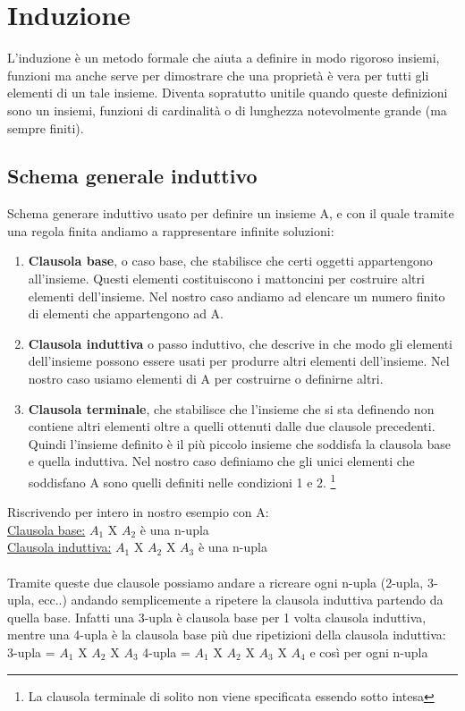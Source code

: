 \newpage
\section{Induzione}
L'induzione è un metodo formale che aiuta a definire in modo rigoroso insiemi, funzioni ma anche serve per dimostrare che una proprietà è vera per tutti gli elementi di un tale insieme. Diventa sopratutto unitile quando queste definizioni sono un insiemi, funzioni di cardinalità o di lunghezza notevolmente grande (ma sempre finiti).
\subsection{Schema generale induttivo}
Schema generare induttivo usato per definire un insieme A, e con il quale tramite una regola finita andiamo a rappresentare infinite soluzioni:
\begin{enumerate}
    \item \textbf{Clausola base}, o caso base, che stabilisce che certi oggetti appartengono all'insieme. Questi elementi costituiscono i mattoncini per costruire altri elementi dell’insieme. Nel nostro caso andiamo ad elencare un numero finito di elementi che appartengono ad A.
    \item \textbf{Clausola induttiva} o passo induttivo, che descrive in che modo gli elementi dell'insieme possono essere usati per produrre altri elementi dell'insieme. Nel nostro caso usiamo elementi di A per costruirne o definirne altri.
    \item \textbf{Clausola terminale}, che stabilisce che l'insieme che si sta definendo non contiene altri elementi oltre a quelli ottenuti dalle due clausole precedenti. Quindi l'insieme definito è il più piccolo insieme che soddisfa la clausola base e quella induttiva. Nel nostro caso definiamo che gli unici elementi che soddisfano A sono quelli definiti nelle condizioni 1 e 2. \footnote{La clausola terminale di solito non viene specificata essendo sotto intesa}
\end{enumerate}
\begin{example}
    Riscrivendo per intero in nostro esempio con A:\\
    \underline{Clausola base:} $A_1$ X $A_2$ è una n-upla\\
    \underline{Clausola induttiva:} $A_1$ X $A_2$ X $A_3$ è una n-upla\\ \\
    Tramite queste due clausole possiamo andare a ricreare ogni n-upla (2-upla, 3-upla, ecc..) andando semplicemente a ripetere la clausola induttiva partendo da quella base. Infatti una 3-upla è clausola base per 1 volta clausola induttiva, mentre una 4-upla è la clausola base più due ripetizioni della clausola induttiva: \\
    3-upla = $A_1$ X $A_2$ X $A_3$ \hspace{.5cm} 4-upla = $A_1$ X $A_2$ X $A_3$ X $A_4$ \hspace{.5cm} e così per ogni n-upla
\end{example}
